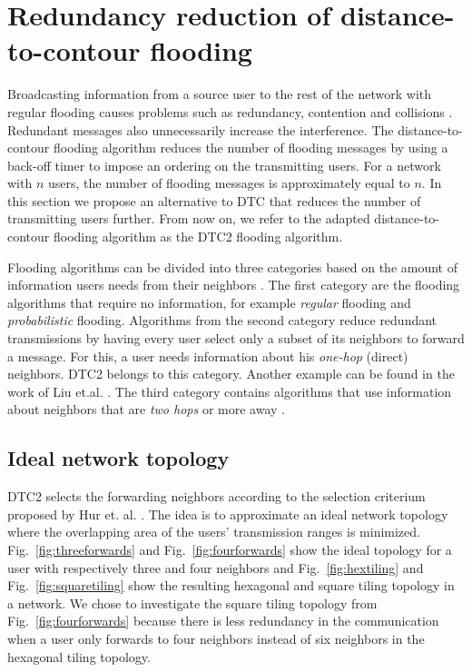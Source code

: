 


\section{Redundancy reduction of distance-to-contour flooding}\label{sec:contri2}

Broadcasting information from a source user to the rest of the network with regular flooding causes problems such as redundancy, contention and collisions \cite{storm}. Redundant messages also unnecessarily increase the interference.  The distance-to-contour flooding algorithm reduces the number of flooding messages by using a back-off timer to impose an ordering on the transmitting users. For a network with $n$ users, the number of flooding messages is approximately equal to $n$. In this section we propose an alternative to DTC that reduces the number of transmitting users further. From now on, we refer to the adapted distance-to-contour flooding algorithm as the DTC2 flooding algorithm. 

Flooding algorithms can be divided into three categories based on the amount of information users needs from their neighbors \cite{1hopflooding}. The first category are the flooding algorithms that require no information, for example \textit{regular} flooding and \textit{probabilistic} flooding. Algorithms from the second category reduce redundant transmissions by having every user select only a subset of its neighbors to forward a message. For this, a user needs information about his \textit{one-hop} (direct) neighbors. DTC2 belongs to this category. Another example can be found in the work of Liu et.al. \cite{1hopflooding}. The third category contains algorithms that use information about neighbors that are \textit{two hops} or more away \cite{2hop}. 

\subsection{Ideal network topology}

DTC2 selects the forwarding neighbors according to the selection criterium proposed by Hur et. al. \cite{dtc2}. The idea is to approximate an ideal network topology where the overlapping area of the users' transmission ranges is minimized. Fig.~\ref{fig:threeforwards} and Fig.~\ref{fig:fourforwards} show the ideal topology for a user with respectively three and four neighbors and Fig.~\ref{fig:hextiling} and Fig.~\ref{fig:squaretiling} show the resulting hexagonal and square tiling topology in a network. We chose to investigate the square tiling topology from Fig.~\ref{fig:fourforwards} because there is less redundancy in the communication when a user only forwards to four neighbors instead of six neighbors in the hexagonal tiling topology.


